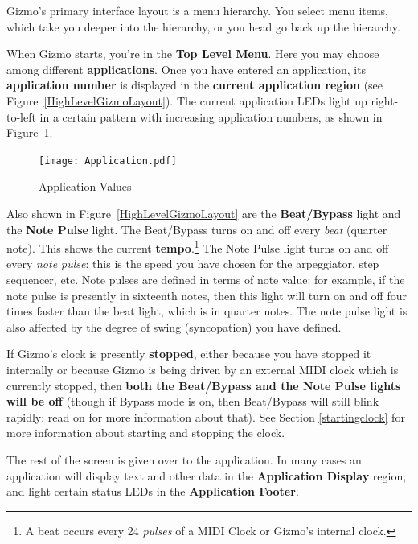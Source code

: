 \documentclass{article}
\begin{document}
Gizmo's primary interface layout is a menu hierarchy.  You select menu items, which take you deeper into the hierarchy, or you head go back up the hierarchy.  

When Gizmo starts, you're in the {\bf Top Level Menu}.  Here you may choose among different {\bf applications}.  Once you have entered an application, its {\bf application number} is displayed in the {\bf current application region} (see Figure~\ref{HighLevelGizmoLayout}). The current application LEDs light up right-to-left in a certain pattern with increasing application numbers, as shown in Figure~\ref{applicationvalues}.   

\begin{figure}
\vspace{-1em}\texttt{[image: Application.pdf]}
\vspace{-2em}\caption{\small Application Values}
\vspace{-1em}
\label{applicationvalues}
\end{figure}

Also shown in Figure~\ref{HighLevelGizmoLayout} are the {\bf Beat/Bypass} light and the {\bf Note Pulse} light.  The Beat/Bypass turns on and off every {\it beat} (quarter note).  This shows the current {\bf tempo}.\footnote{A beat occurs every 24 {\it pulses} of a MIDI Clock or Gizmo's internal clock.}  The Note Pulse light turns on and off every {\it note pulse}: this is the speed you have chosen for the arpeggiator, step sequencer, etc.  Note pulses are defined in terms of note value: for example, if the note pulse is presently in sixteenth notes, then this light will turn on and off four times faster than the beat light, which is in quarter notes. The note pulse light is also affected by the degree of swing (syncopation) you have defined.

If Gizmo's clock is presently {\bf stopped}, either because you have stopped it internally or because Gizmo is being driven by an external MIDI clock which is currently stopped, then {\bf both the Beat/Bypass and the Note Pulse lights will be off} (though if Bypass mode is on, then Beat/Bypass will still blink rapidly: read on for more information about that).  See Section \ref{startingclock} for more information about starting and stopping the clock.

The rest of the screen is given over to the application.  In many cases an application will display text and other data in the {\bf Application Display} region, and light certain status LEDs in the {\bf Application Footer}.
\end{document}
